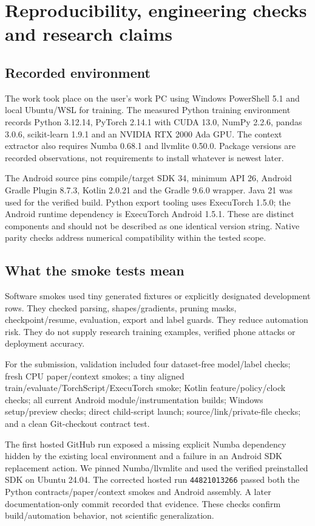 \documentclass[11pt,a4paper,oneside]{report}
\newcommand{\code}[1]{\nolinkurl{#1}}
\begin{document}
\chapter{Reproducibility, engineering checks and research claims}
\section{Recorded environment}
The work took place on the user's work PC using Windows PowerShell 5.1 and local Ubuntu/WSL for training. The measured Python training environment records Python 3.12.14, PyTorch 2.14.1 with CUDA 13.0, NumPy 2.2.6, pandas 3.0.6, scikit-learn 1.9.1 and an NVIDIA RTX 2000 Ada GPU. The context extractor also requires Numba 0.68.1 and llvmlite 0.50.0. Package versions are recorded observations, not requirements to install whatever is newest later.

The Android source pins compile/target SDK 34, minimum API 26, Android Gradle Plugin 8.7.3, Kotlin 2.0.21 and the Gradle 9.6.0 wrapper. Java 21 was used for the verified build. Python export tooling uses ExecuTorch 1.5.0; the Android runtime dependency is ExecuTorch Android 1.5.1. These are distinct components and should not be described as one identical version string. Native parity checks address numerical compatibility within the tested scope.

\section{What the smoke tests mean}
Software smokes used tiny generated fixtures or explicitly designated development rows. They checked parsing, shapes/gradients, pruning masks, checkpoint/resume, evaluation, export and label guards. They reduce automation risk. They do not supply research training examples, verified phone attacks or deployment accuracy.

For the submission, validation included four dataset-free model/label checks; fresh CPU paper/context smokes; a tiny aligned train/evaluate/TorchScript/ExecuTorch smoke; Kotlin feature/policy/clock checks; all current Android module/instrumentation builds; Windows setup/preview checks; direct child-script launch; source/link/private-file checks; and a clean Git-checkout contract test.

The first hosted GitHub run exposed a missing explicit Numba dependency hidden by the existing local environment and a failure in an Android SDK replacement action. We pinned Numba/llvmlite and used the verified preinstalled SDK on Ubuntu 24.04. The corrected hosted run \code{44821013266} passed both the Python contracts/paper/context smokes and Android assembly. A later documentation-only commit recorded that evidence. These checks confirm build/automation behavior, not scientific generalization.
\end{document}
